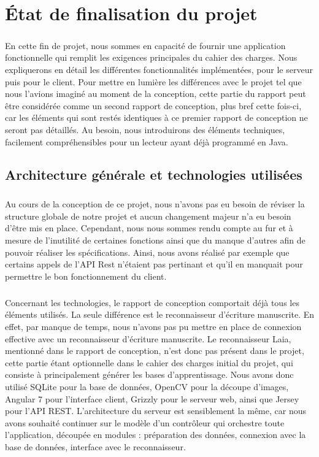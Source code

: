 \chapter{État de finalisation du projet}

\paragraph{}
En cette fin de projet, nous sommes en capacité de fournir une application fonctionnelle qui remplit les exigences principales du cahier des charges. Nous expliquerons en détail les différentes fonctionnalités implémentées, pour le serveur puis pour le client. Pour mettre en lumière les différences avec le projet tel que nous l'avions imaginé au moment de la conception, cette partie du rapport peut être considérée comme un second rapport de conception, plus bref cette fois-ci, car les éléments qui sont restés identiques à ce premier rapport de conception ne seront pas détaillés. Au besoin, nous introduirons des éléments techniques, facilement compréhensibles pour un lecteur ayant déjà programmé en Java.

\section{Architecture générale et technologies utilisées}

\paragraph{}
Au cours de la conception de ce projet, nous n'avons pas eu besoin de réviser la structure globale de notre projet et aucun changement majeur n'a eu besoin d'être mis en place. Cependant, nous nous sommes rendu compte au fur et à mesure de l'inutilité de certaines fonctions ainsi que du manque d'autres afin de pouvoir réaliser les spécifications. Ainsi, nous avons réalisé par exemple que certains appels de l'API Rest n'étaient pas pertinant et qu'il en manquait pour permettre le bon fonctionnement du client.

\paragraph{}
Concernant les technologies, le rapport de conception comportait déjà tous les éléments utilisés. La seule différence est le reconnaisseur d'écriture manuscrite. En effet, par manque de temps, nous n'avons pas pu mettre en place de connexion effective avec un reconnaisseur d'écriture manuscrite. Le reconnaisseur Laia, mentionné dans le rapport de conception, n'est donc pas présent dans le projet, cette partie étant optionnelle dans le cahier des charges initial du projet, qui consiste à principalement générer les bases d'apprentissage. Nous avons donc utilisé SQLite pour la base de données, OpenCV pour la découpe d'images, Angular 7 pour l'interface client, Grizzly pour le serveur web, ainsi que Jersey pour l'API REST. L'architecture du serveur est sensiblement la même, car nous avons souhaité continuer sur le modèle d'un contrôleur qui orchestre toute l'application, découpée en modules : préparation des données, connexion avec la base de données, interface avec le reconnaisseur.

